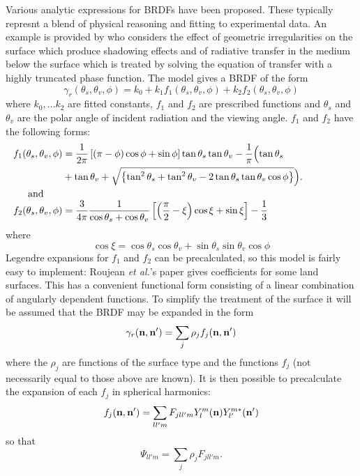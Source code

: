 Various analytic expressions for BRDFs have been proposed. These typically
represnt a blend of physical reasoning and fitting to experimental data.
An example is provided by \cite{Roujean92} who considers the effect of 
geometric irregularities on the surface which produce shadowing effects
and of radiative transfer in the medium below the surface which is treated
by solving the equation of transfer with a highly truncated phase function.
The model gives a BRDF of the form
\begin{equation}
\gamma_r(\theta_s, \theta_v, \phi) = k_0 +k_1 f_1(\theta_s, \theta_v, \phi)
+k_2 f_2(\theta_s, \theta_v, \phi)
\end{equation}
where $k_0, \ldots k_2$ are fitted constants, $f_1$ and $f_2$ are prescribed
functions and $\theta_s$ and $\theta_v$ are the polar angle of incident
radiation and the viewing angle. $f_1$ and $f_2$ have the following forms:
\begin{align}
f_1(\theta_s, \theta_v, \phi) &= {1\over {2\pi}} \left [ (\pi-\phi) \cos \phi
+\sin \phi \right ] \tan \theta_s \tan \theta_v 
 - {1\over\pi} \Bigl ( \tan \theta_s \\
& + \tan \theta_v + \sqrt {\left \{
\tan^2 \theta_s + \tan^2 \theta_v -2 \tan \theta_s \tan \theta_v \cos \phi
\right\}} \Bigr ). \nonumber \\
\noalign{and}
f_2(\theta_s, \theta_v, \phi) &= {3\over{4\pi}} {1\over{\cos\theta_s +
\cos\theta_v}} \left [ \left ( {\pi\over2} - \xi \right ) \cos \xi
+ \sin \xi \right ] -{1\over 3}
\end{align}
where 
\begin{equation}
\cos \xi = \cos\theta_s \cos\theta_v + \sin\theta_s\sin\theta_v \cos\phi
\end{equation}
Legendre expansions for $f_1$ and $f_2$ can be precalculated, so this
model is fairly easy to implement: Roujean {\it et al.}'s paper gives 
coefficients for some land surfaces. This has a convenient functional
form consisting of a linear combination of angularly dependent functions.
To simplify the treatment of the surface it will be assumed that the
BRDF may be expanded in the form
\begin{equation}
\gamma_r(\mathbf{n}, \mathbf{n}') = \sum_j \rho_j f_j(\mathbf{n},\mathbf{n}')
\end{equation}
where the $\rho_j$ are functions of the surface type and the functions
$f_j$ (not necessarily equal to those above are known). It is then 
possible to precalculate the expansion of each $f_j$ in spherical harmonics:
\begin{equation}
f_j(\mathbf{n},\mathbf{n}') = \sum_{ll'm} F_{jll'm} Y_l^m(\mathbf{n}) Y_{l'}^{m*}(\mathbf{n}')
\end{equation}
so that
\begin{equation}
\Psi_{ll'm}= \sum_j \rho_j F_{jll'm}.
\end{equation}

